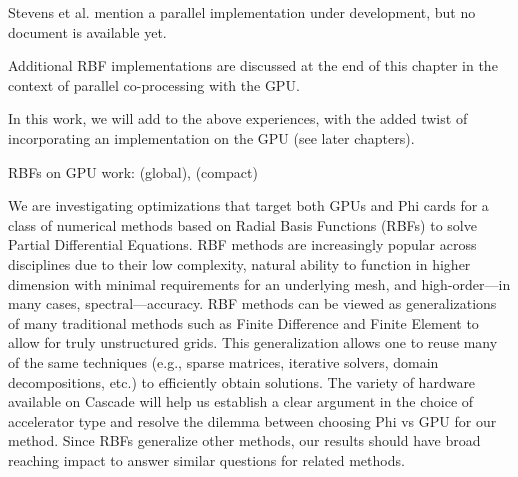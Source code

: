 \documentclass[11pt]{report}
\begin{document}
{Stevens et al. \cite{Stevens2009a} mention a parallel implementation under development, but no document is available yet. 

Additional RBF implementations are discussed at the end of this chapter in the context of parallel co-processing with the GPU. 

In this work, we will add to the above experiences, with the added twist of incorporating an implementation on the GPU (see later chapters). 


RBFs on GPU work: \cite{Schmidt2009a, Schmidt2009b} (global), \cite{Yokota2010} (compact)


We are investigating optimizations that target both GPUs and Phi cards for a class of numerical methods based on Radial Basis Functions (RBFs) to solve Partial Differential Equations. RBF methods are increasingly popular across disciplines due to their low complexity, natural ability to function in higher dimension with minimal requirements for an underlying mesh, and high-order---in many cases, spectral---accuracy. RBF methods can be viewed as generalizations of many traditional methods such as Finite Difference and Finite Element to allow for truly unstructured grids. This generalization allows one to reuse many of the same techniques (e.g., sparse matrices, iterative solvers, domain decompositions, etc.) to efficiently obtain solutions. The variety of hardware available on Cascade will help us establish a clear argument in the choice of accelerator type and resolve the dilemma between choosing Phi vs GPU for our method. Since RBFs generalize other methods, our results should have broad reaching impact to answer similar questions for related methods.


}

%
%

\ifstandalone


\end{document}
